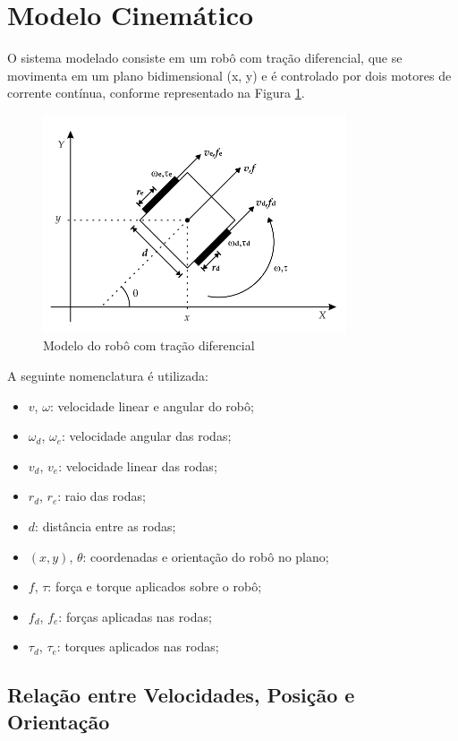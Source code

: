 \section{Modelo Cinemático}

O sistema modelado consiste em um robô com tração diferencial,  
que se movimenta em um plano bidimensional (x, y) e é controlado por dois motores  
de corrente contínua, conforme representado na Figura \ref{fig:robot_model}.
\begin{figure}[h]
    \centering
    \includegraphics[width=0.8\textwidth]{figures/robot_model.png}
    \caption{Modelo do robô com tração diferencial}
    \label{fig:robot_model}
\end{figure}

A seguinte nomenclatura é utilizada:

\begin{itemize}
    \item $v$, $\omega$: velocidade linear e angular do robô;
    \item $\omega_d$, $\omega_e$: velocidade angular das rodas;
    \item $v_d$, $v_e$: velocidade linear das rodas;
    \item $r_d$, $r_e$: raio das rodas;
    \item $d$: distância entre as rodas;
    \item $(x, y)$, $\theta$: coordenadas e orientação do robô no plano;
    \item $f$, $\tau$: força e torque aplicados sobre o robô;
    \item $f_d$, $f_e$: forças aplicadas nas rodas;
    \item $\tau_d$, $\tau_e$: torques aplicados nas rodas;
\end{itemize}

\subsection{Relação entre Velocidades, Posição e Orientação}


